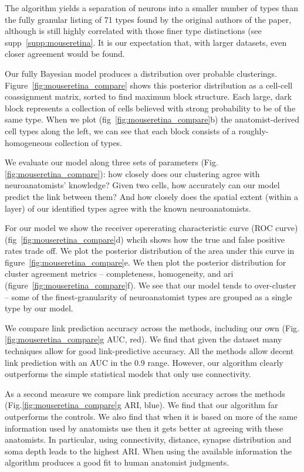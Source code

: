 \documentclass{article}
\begin{document}
{The algorithm yields a separation of neurons into a smaller number of
types than the fully granular listing of 71 types found by the
original authors of the paper, although is still highly correlated
with those finer type distinctions (see
supp~\ref{supp:mouseretina}. It is our expectation that, with larger
datasets, even closer agreement would be found.

Our fully Bayesian model produces a distribution over probable
clusterings.  Figure~\ref{fig:mouseretina_compare} shows this
posterior distribution as a cell-cell coassignment matrix, sorted to
find maximum block structure. Each large, dark block represents a
collection of cells believed with strong probability to be of the same
type. When we plot (fig~\ref{fig:mouseretina_compare}b) the
anatomist-derived cell types along the left, we can see that each
block consists of a roughly-homogeneous collection of types. 

We evaluate our model along three sets of parameters
(Fig.\ref{fig:mouseretina_compare}): how closely does our clustering agree
with neuroanatomists' knowledge?  Given two cells, how accurately can
our model predict the link between them? And how closely does the
spatial extent (within a layer) of our identified types agree with the
known neuroanatomists.

For our model we show the receiver opererating characteristic curve
(ROC curve) (fig~\ref{fig:mouseretina_compare}d) whcih shows how the
true and false positive rates trade off. We plot the posterior
distribution of the area under this curve in
figure~\ref{fig:mouseretina_compare}e. We then plot the 
posterior distribution for cluster agreement metrics -- completeness,
homogeneity, and ari (figure~\ref{fig:mouseretina_compare}f). We see
that our model tends to over-cluster -- some of the finest-granularity of
neuroanatomist types are grouped as a single type by our model. 

We compare link prediction accuracy across the
methods, including our own (Fig.\ref{fig:mouseretina_compare}g AUC, red).  We find that
given the dataset many techniques allow for good link-predictive
accuracy. All the methods allow decent link prediction with an AUC in
the 0.9 range. However, our algorithm clearly outperforms the simple
statistical models that only use connectivity.

As a second measure we compare link prediction accuracy across the
methods (Fig.\ref{fig:mouseretina_compare}g ARI, blue). We find that our
algorithm far outperforms the controls. We also find that when it is
based on more of the same information used by anatomists use then it
gets better at agreeing with these anatomists. In particular, using
connectivity, distance, synapse distribution and soma depth leads to
the highest ARI. When using the available information the algorithm
produces a good fit to human anatomist judgments.

}
\end{document}

